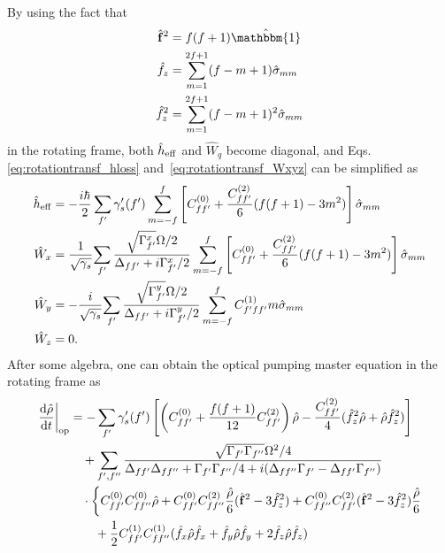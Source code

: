 \documentclass[preprint,aps,pra,onecolumn,superscriptaddress]{revtex4-1} %
\newcommand{\dt}[1]{\frac{{\mathrm d} {#1}}{{\mathrm d}t}}
\newcommand{\nn}{\nonumber}
\newcommand{\fo}{\hat{\mathbf{f}}}
\begin{document}
\begin{appendix}
By using the fact that 
\begin{subequations}
\begin{align}
\hat{\mathbf{f}}^2 &=f(f+1)\hat{\mathbbm{1}}\\
\hat{f}_z &=\sum_{m=1}^{2f+1}(f-m+1)\hat{\sigma}_{mm}\\
\hat{f}_z^2 &= \sum_{m=1}^{2f+1}(f-m+1)^2\hat{\sigma}_{mm}
\end{align}
\end{subequations}
in the rotating frame, both $ \hat{h}_{\rm eff} $ and $ \hat{W}_{q} $ become diagonal, and Eqs.\eqref{eq:rotationtransf_hloss} and~\eqref{eq:rotationtransf_Wxyz} can be simplified as
\begin{subequations}
\begin{align}
\hat{h}_{\rm eff} &= -\frac{i\hbar}{2} \sum_{f'} \gamma'_s(f') \sum_{m=-f}^f\left[C_{ff'}^{(0)} + \frac{C_{ff'}^{(2) }}{6}(f(f+1)-3m^2) \right]\hat{\sigma}_{mm}\\
\hat{W}_{x} &= \frac{1}{\sqrt{\gamma_s}}\!\sum_{f'} \frac{\sqrt{\Gamma_{f'}^x }\Omega/2}{\Delta_{ff'}+i\Gamma_{f'}^x/2 } \sum_{m=-f}^f\left[C_{ff'}^{(0)} + \frac{C_{ff'}^{(2) }}{6}(f(f+1)-3m^2) \right]\hat{\sigma}_{mm}\\
\hat{W}_{y} &= -\frac{i}{\sqrt{\gamma_s}}\!\sum_{f'} \frac{\sqrt{\Gamma_{f'}^y }\Omega/2}{\Delta_{ff'}+i\Gamma_{f'}^y/2 } \sum_{m=-f}^f C_{f'ff'}^{(1)}m\hat{\sigma}_{mm}\\
\hat{W}_z &=0.
\end{align}
\end{subequations}
After some algebra, one can obtain the optical pumping master equation in the rotating frame as
\begin{align}
\left. \dt{\hat{\rho}}\right|_{\rm op} 
&= - \sum_{f'} \gamma'_s(f') \left[\left(C_{ff'}^{(0)}+\frac{f(f+1)}{12}C_{ff'}^{(2)} \right)\hat{\rho}-\frac{C_{ff'}^{(2)}}{4}(\hat{f}_z^2\hat{\rho}+\hat{\rho}\hat{f}_z^2) \right]\nn\\
&\quad+\sum_{f',f''} \frac{\sqrt{\Gamma_{f'}\Gamma_{f''} }\Omega^2/4 }{\Delta_{ff'}\Delta_{ff''}+\Gamma_{f'}\Gamma_{f''}/4+i(\Delta_{ff''}\Gamma_{f'}-\Delta_{ff'}\Gamma_{f''} ) }\nn\\
&\quad\cdot\left\{C_{ff'}^{(0)}C_{ff''}^{(0)}\hat{\rho}+ C_{ff'}^{(0)}C_{ff''}^{(2)}\frac{\hat{\rho}}{6}(\fo^2-3\hat{f}_z^2) + C_{ff''}^{(0)}C_{ff'}^{(2)}(\fo^2-3\hat{f}_z^2)\frac{\hat{\rho}}{6} \right.\nn\\
&\quad\quad + \frac{1}{2}C_{ff'}^{(1)}C_{ff''}^{(1)}(\hat{f}_x\hat{\rho}\hat{f}_x+\hat{f}_y\hat{\rho}\hat{f}_y+2\hat{f}_z\hat{\rho}\hat{f}_z )\nn\\

\end{align}
\end{appendix}
\end{document}
